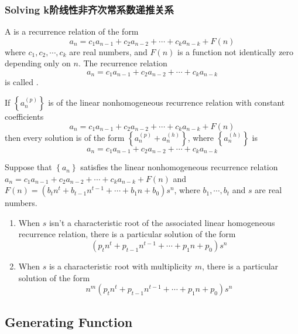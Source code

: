 \subsubsection{Solving k阶线性非齐次常系数递推关系}

\begin{definition}
    A  is a recurrence relation of the form 
    \[ a_n = c_1a_{n-1} + c_2a_{n-2}+ \cdots + c_k a_{n-k} +F(n) \]
    where $c_1,c_2,\cdots, c_k$ are real numbers, and $F(n)$ is a function not identically zero depending only on $n$. The recurrence relation 
    \[ a_n = c_1a_{n-1} + c_2a_{n-2}+ \cdots + c_k a_{n-k} \]
    is called . 
\end{definition}

\begin{theorem}
    If $\left\{ a_n^{(p)} \right\}$ is  of the linear nonhomogeneous recurrence relation with constant coefficients
    \[ a_n = c_1a_{n-1} + c_2a_{n-2}+ \cdots + c_k a_{n-k} +F(n) \]
    then every solution is of the form $\left\{ a_n^{(p)}+a_n^{(h)} \right\}$, where $\left\{a_n^{(h)}\right\}$ is 
    \[ a_n = c_1a_{n-1} + c_2a_{n-2}+ \cdots + c_k a_{n-k} \]
\end{theorem}

\begin{theorem}
    Suppose that $\left\{a_n\right\}$ satisfies the linear nonhomogeneous recurrence relation $ a_n = c_1a_{n-1} + c_2a_{n-2}+ \cdots + c_k a_{n-k} +F(n) $ and $F(n)=(b_tn^t+b_{t-1}n^{t-1}+\cdots+b_1n+b_0)s^n$, where $b_1,\cdots ,b_t$ and $s$ are real numbers.
    \begin{enumerate}
        \item When $s$ isn't a characteristic root of the associated linear homogeneous recurrence relation, there is a particular solution of the form 
        \[ (p_tn^t+p_{t-1}n^{t-1}+\cdots+p_1n+p_0)s^n \]
        \item When $s$ is a characteristic root with multiplicity $m$, there is a particular solution of the form 
        \[ n^m(p_tn^t+p_{t-1}n^{t-1}+\cdots+p_1n+p_0)s^n \]
    \end{enumerate}
\end{theorem}

\subsection{Generating Function}

